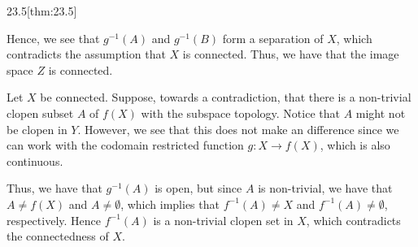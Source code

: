 \begin{thmBox}{23.5}[thm:23.5]
\begin{proofBox}
        \baseSkip

        Hence, we see that \( g^{ -1 } ( A ) \) and \( g^{ -1 } ( B ) \)
        form a separation of \( X \), which contradicts the assumption that 
        \( X \) is connected.
        Thus, we have that the image space \( Z \) is connected.

        \baseRule

        Let \( X \) be connected.
        Suppose, towards a contradiction, that there is a non-trivial
        clopen subset \( A \) of \( f ( X ) \) with the subspace topology.
        Notice that \( A \) might not be clopen in \( Y \).
        However, we see that this does not make an difference since we can work
        with the codomain restricted function \( g: X \rightarrow f ( X ) \),
        which is also continuous.

        \baseSkip

        Thus, we have that \( g^{ -1 } ( A ) \) is open, but since \( A \) is
        non-trivial, we have that \( A \neq f ( X ) \) and 
        \( A \neq \emptyset \), which implies that \( f^{ -1 } ( A ) \neq X \) 
        and \( f^{ -1 } ( A ) \neq \emptyset \),  respectively. 
        Hence \( f^{ -1 } ( A ) \) is a non-trivial clopen set in \( X \), 
        which contradicts the connectedness of \( X \).
    \end{proofBox}
\end{thmBox}

